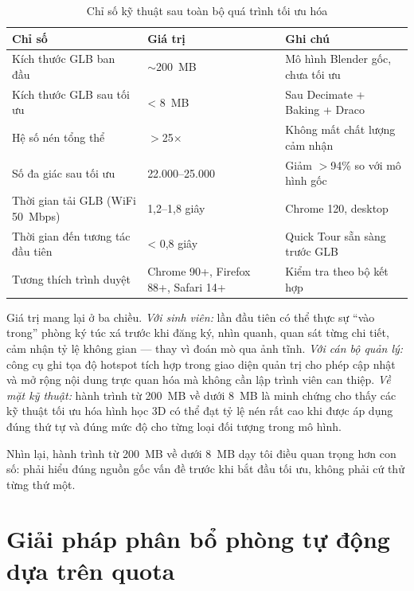 \documentclass[../DoAn.tex]{subfiles}
\begin{document}
\begin{table}[H]
\centering
\caption{Chỉ số kỹ thuật sau toàn bộ quá trình tối ưu hóa}
\label{tab:viz_metrics}
\small
\begin{tabular}{|p{5.8cm}|p{2.6cm}|p{4.4cm}|}
\hline
\textbf{Chỉ số} & \textbf{Giá trị} & \textbf{Ghi chú} \\
\hline
Kích thước GLB ban đầu & $\sim$200~MB & Mô hình Blender gốc, chưa tối ưu \\
\hline
Kích thước GLB sau tối ưu & < 8~MB & Sau Decimate + Baking + Draco \\
\hline
Hệ số nén tổng thể & $>$25$\times$ & Không mất chất lượng cảm nhận \\
\hline
Số đa giác sau tối ưu & 22.000--25.000 & Giảm $>$94\% so với mô hình gốc \\
\hline
Thời gian tải GLB (WiFi 50~Mbps) & 1,2--1,8 giây & Chrome 120, desktop \\
\hline
Thời gian đến tương tác đầu tiên & < 0,8 giây & Quick Tour sẵn sàng trước GLB \\
\hline
Tương thích trình duyệt & Chrome 90+, Firefox 88+, Safari 14+ & Kiểm tra theo bộ kết hợp \\
\hline
\end{tabular}
\end{table}

Giá trị mang lại ở ba chiều. \textit{Với sinh viên:} lần đầu tiên có thể
thực sự ``vào trong'' phòng ký túc xá trước khi đăng ký, nhìn quanh, quan sát
từng chi tiết, cảm nhận tỷ lệ không gian --- thay vì đoán mò qua ảnh tĩnh.
\textit{Với cán bộ quản lý:} công cụ ghi tọa độ hotspot tích hợp trong giao
diện quản trị cho phép cập nhật và mở rộng nội dung trực quan hóa mà không cần
lập trình viên can thiệp. \textit{Về mặt kỹ thuật:} hành trình từ 200~MB về
dưới 8~MB là minh chứng cho thấy các kỹ thuật tối ưu hóa hình học 3D có thể
đạt tỷ lệ nén rất cao khi được áp dụng đúng thứ tự và đúng mức độ cho từng
loại đối tượng trong mô hình.

Nhìn lại, hành trình từ 200~MB về dưới 8~MB dạy tôi điều quan trọng hơn con
số: phải hiểu đúng nguồn gốc vấn đề trước khi bắt đầu tối ưu, không phải cứ
thử từng thứ một.

\section{Giải pháp phân bổ phòng tự động dựa trên quota}
\label{sec:contrib_allocation}
\end{document}
